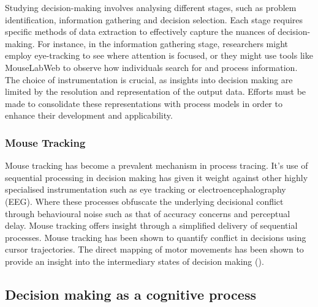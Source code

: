 \documentclass[man, floatsintext]{apa7}
\begin{document}
Studying decision-making involves analysing different stages, such as problem identification, information gathering and decision selection. Each stage requires specific methods of data extraction to effectively capture the nuances of decision-making. For instance, in the information gathering stage, researchers might employ eye-tracking to see where attention is focused, or they might use tools like MouseLabWeb to observe how individuals search for and process information. The choice of instrumentation is crucial, as insights into decision making are limited by the resolution and representation of the output data. Efforts must be made to consolidate these representations with process models in order to enhance their development and applicability.

\subsubsection{Mouse Tracking}

Mouse tracking has become a prevalent mechanism in process tracing. It's use of sequential processing in decision making has given it weight against other highly specialised instrumentation such as eye tracking or electroencephalography (EEG). Where these processes obfuscate the underlying decisional conflict through behavioural noise such as that of accuracy concerns and perceptual delay. Mouse tracking offers insight through a simplified delivery of sequential processes. Mouse tracking has been shown to quantify conflict in decisions using cursor trajectories. The direct mapping of motor movements has been shown to provide an insight into the intermediary states of decision making (\cite{stillmanHowMousetrackingCan2018}).

\subsection{Decision making as a cognitive process}
\end{document}
